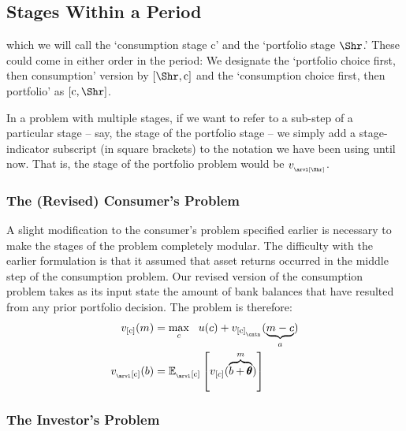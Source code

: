 \documentclass[titlepage, headings=optiontotocandhead]{Resources/texmf-local/tex/latex/econtex}
\begin{document}
\hypertarget{stages-within-a-period}{}
\subsection{{Stage}s Within a {Period}}\label{subsec:stageswithin}

which we will call the `consumption {stage} $\mathrm{c}$' and the `portfolio {stage} $\Shr$.'  These could come in either order in the {period}: We designate the `portfolio choice first, then consumption' version by $[\Shr,\mathrm{c}]$ and the `consumption choice first, then portfolio' as $[\mathrm{c},\Shr]$.

In a problem with multiple {stages}, if we want to refer to a sub-{step} of a particular {stage} -- say, the {\Arrival} {stage} of the portfolio {stage} -- we simply add a {stage}-indicator subscript (in square brackets) to the notation we have been using until now.  That is, the {\Arrival} {stage} of the portfolio problem would be $v_{_\arvl[\Shr]}$.

\hypertarget{revised-consumers-problem}{}
\subsubsection{The (Revised) Consumer's Problem}\label{subsubsec:revised-consumers-problem}

A slight modification to the consumer's problem specified earlier is necessary to make the {stage}s of the problem completely modular.  The difficulty with the earlier formulation is that it assumed that asset returns occurred in the middle {step} of the consumption problem.  Our revised version of the consumption problem takes as its input state the amount of bank balances that have resulted from any prior portfolio decision.  The problem is therefore:
  \begin{equation}\begin{gathered}\begin{aligned}
 v_{[\mathrm{c}]}(m) & =  \max_{c} ~~ u(c)+  v_{[\mathrm{c}]_{_\cntn}}(\underbrace{m-c}_{a})             
\\    v_{_\arvl[\mathrm{c}]}(b) & = {\mathbb{E}}_{_\arvl[\mathrm{c}]}\left[v_{[c]}(\overbrace{b+\pmb{\theta}}^{m})\right] \label{eq:vBalances}
      \end{aligned}\end{gathered}\end{equation}


\hypertarget{subsubsec:investors-problem}{}
\subsubsection{The Investor's Problem}\label{subsubsec:investors-problem}
\end{document}
